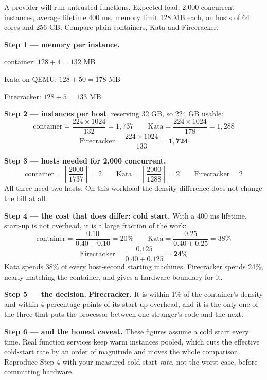 \begin{worked}
A provider will run untrusted functions. Expected load: 2{,}000 concurrent
instances, average lifetime 400 ms, memory limit 128 MB each, on hosts of 64
cores and 256 GB. Compare plain containers, Kata and Firecracker.

\smallskip
\textbf{Step 1 --- memory per instance.}
\begin{tight}
  \item container: $128 + 4 = 132$ MB
  \item Kata on QEMU: $128 + 50 = 178$ MB
  \item Firecracker: $128 + 5 = 133$ MB
\end{tight}

\smallskip
\textbf{Step 2 --- instances per host}, reserving 32 GB, so 224 GB usable:
\[ \text{container} = \frac{224 \times 1024}{132} = 1{,}737 \qquad
   \text{Kata} = \frac{224 \times 1024}{178} = 1{,}288 \]
\[ \text{Firecracker} = \frac{224 \times 1024}{133} = \mathbf{1{,}724} \]

\smallskip
\textbf{Step 3 --- hosts needed for 2{,}000 concurrent.}
\[ \text{container} = \left\lceil \frac{2000}{1737} \right\rceil = 2 \qquad
   \text{Kata} = \left\lceil \frac{2000}{1288} \right\rceil = 2 \qquad
   \text{Firecracker} = 2 \]
All three need two hosts. On this workload the density difference does not
change the bill at all.

\smallskip
\textbf{Step 4 --- the cost that does differ: cold start.} With a 400 ms
lifetime, start-up is not overhead, it is a large fraction of the work:
\[ \text{container} = \frac{0.10}{0.40 + 0.10} = 20\% \qquad
   \text{Kata} = \frac{0.25}{0.40 + 0.25} = 38\% \]
\[ \text{Firecracker} = \frac{0.125}{0.40 + 0.125} = \mathbf{24\%} \]
Kata spends 38\% of every host-second starting machines. Firecracker spends
24\%, nearly matching the container, and gives a hardware boundary for it.

\smallskip
\textbf{Step 5 --- the decision.} \textbf{Firecracker.} It is within 1\% of the
container's density and within 4 percentage points of its start-up overhead,
and it is the only one of the three that puts the processor between one
stranger's code and the next.

\smallskip
\textbf{Step 6 --- and the honest caveat.} These figures assume a cold start
every time. Real function services keep warm instances pooled, which cuts the
effective cold-start rate by an order of magnitude and moves the whole
comparison. Reproduce Step 4 with your measured cold-start \emph{rate}, not the
worst case, before committing hardware.
\end{worked}

